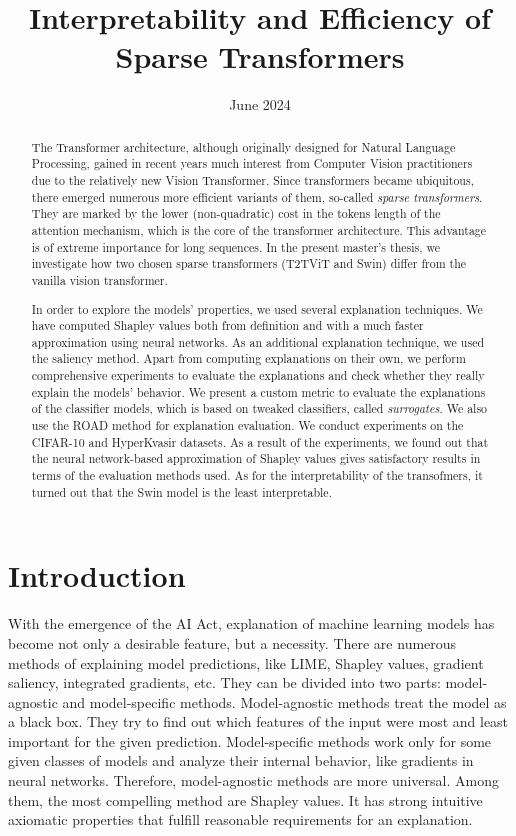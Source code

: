 \documentclass[magisterska,en]{pracamgr}
\title{Interpretability and Efficiency of Sparse Transformers}
\date{June 2024}
\begin{document}
\maketitle

\begin{abstract}
The Transformer architecture, although originally designed for Natural Language Processing, gained in recent years much interest from Computer Vision practitioners due to the relatively new Vision Transformer. Since transformers became ubiquitous, there emerged numerous more efficient variants of them, so-called \emph{sparse transformers}. They are marked by the lower (non-quadratic) cost in the tokens length of the attention mechanism, which is the core of the transformer architecture. This advantage is of extreme importance for long sequences. In the present master's thesis, we investigate how two chosen sparse transformers (T2T\textunderscore ViT and Swin) differ from the vanilla vision transformer.

In order to explore the models' properties, we used several explanation techniques. We have computed Shapley values both from definition and with a much faster approximation using neural networks. As an additional explanation technique, we used the saliency method. Apart from computing explanations on their own, we perform comprehensive experiments to evaluate the explanations and check whether they really explain the models' behavior. We present a custom metric to evaluate the explanations of the classifier models, which is based on tweaked classifiers, called \emph{surrogates}. We also use the ROAD method for explanation evaluation. We conduct experiments on the CIFAR-10 and HyperKvasir datasets.
As a result of the experiments, we found out that the neural network-based approximation of Shapley values gives satisfactory results in terms of the evaluation methods used. As for the interpretability of the transofmers, it turned out that the Swin model is the least interpretable.
\end{abstract}

\tableofcontents

\chapter*{Introduction}
With the emergence of the AI Act, explanation of machine learning models has become not only a desirable feature, but a necessity. There are numerous methods of explaining model predictions, like LIME, Shapley values, gradient saliency, integrated gradients, etc. They can be divided into two parts: model-agnostic and model-specific methods. Model-agnostic methods treat the model as a black box. They try to find out which features of the input were most and least important for the given prediction. Model-specific methods work only for some given classes of models and analyze their internal behavior, like gradients in neural networks.
Therefore, model-agnostic methods are more universal. Among them, the most compelling method are Shapley values. It has strong intuitive axiomatic properties that fulfill reasonable requirements for an explanation.
\end{document}
